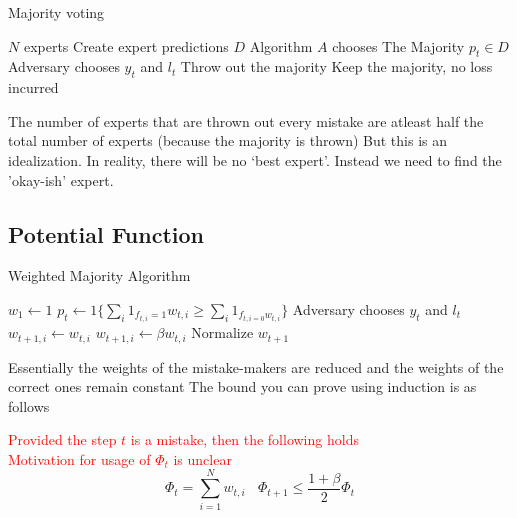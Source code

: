 \begin{algorithm}[H]
    \caption{Majority voting}
    \begin{algorithmic}[1]
        \Require $N$ experts
            \State Create expert predictions $D$
            \State Algorithm $A$ chooses The Majority $p_t \in D$
            \State Adversary chooses $y_t$ and $l_t$
                \State Throw out the majority
            \Else
                \State Keep the majority, no loss incurred
            \EndIf


        \EndFor
    \end{algorithmic}
    
\end{algorithm}
The number of experts that are thrown out every mistake are atleast half the total number of experts (because the majority is thrown)
But this is an idealization. In reality, there will be no `best expert'. Instead we need to find the 'okay-ish' expert.

\subsection*{Potential Function}


\begin{algorithm}[H]
    \caption{Weighted Majority Algorithm}
        \begin{algorithmic}
                \State $w_1 \gets 1$
                    \State $p_t \gets  1 \{ \sum_i  1_{f_{t, i} = 1} w_{t,i} \ge \sum_i 1_{f_{t, i = 0} w_{t, i}} \}$
                    \State Adversary chooses $y_t$ and $l_t$
                        \State $w_{t+1,i} \gets w_{t,i}$
                    \Else
                        \State $w_{t+1,i} \gets \beta w_{t,i}$ 
                    \EndIf
                    \State Normalize $w_{t+1}$
                \EndFor
        \end{algorithmic}
\end{algorithm}

Essentially the weights of the mistake-makers are reduced and the weights of the correct ones remain constant
The bound you can prove using induction is as follows 

\textcolor{red}{Provided the step $t$ is a mistake, then the following holds}
\\
\textcolor{red}{Motivation for usage of $\Phi_t$ is unclear}
\begin{equation}
    \label{Potential}
        \Phi_t = \sum_{i=1}^N w_{t,i} \ \ \ \ \Phi_{t + 1} \le \frac{1 + \beta}{2} \Phi_t
\end{equation}

